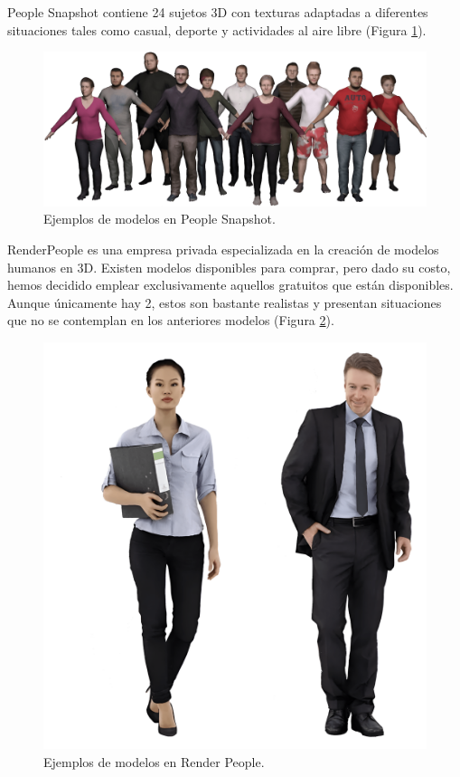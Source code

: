 People Snapshot \cite{63} contiene 24 sujetos 3D con texturas adaptadas a diferentes situaciones tales como casual, deporte y actividades al aire libre (Figura \ref{fig20}).

\begin{figure}[H]
	\centering
	\includegraphics[scale=0.5]{imagenes/cap4/snapshot.png}
	\caption[Ejemplos People Snapshot]{Ejemplos de modelos en People Snapshot.}
	\label{fig20}
\end{figure}

RenderPeople es una empresa privada especializada en la creación de modelos humanos en 3D. Existen modelos disponibles para comprar, pero dado su costo, hemos decidido emplear exclusivamente aquellos gratuitos que están disponibles. Aunque únicamente hay 2, estos son bastante realistas y presentan situaciones que no se contemplan en los anteriores modelos (Figura \ref{fig21}).

\begin{figure}[H]
	\centering
	\includegraphics[scale=0.04]{imagenes/cap4/renderpeople.png}
	\caption[Ejemplos Render People]{Ejemplos de modelos en Render People.}
	\label{fig21}
\end{figure}

